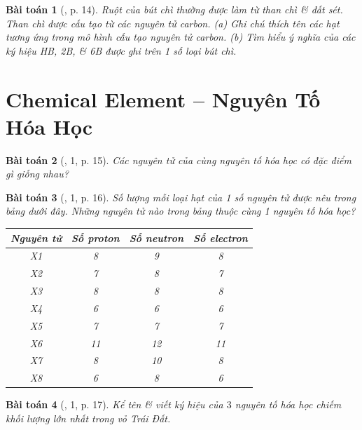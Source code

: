 \documentclass{article}
\newtheorem{baitoan}{Bài toán}
\begin{document}
\begin{baitoan}[\cite{SGK_KHTN_7_Canh_Dieu}, p. 14]
	Ruột của bút chì thường được làm từ than chì \& đất sét. Than chì được cấu tạo từ các nguyên tử carbon. (a) Ghi chú thích tên các hạt tương ứng trong mô hình cấu tạo nguyên tử carbon. (b) Tìm hiểu ý nghĩa của các ký hiệu HB, 2B, \& 6B được ghi trên 1 số loại bút chì.
\end{baitoan}


\section{Chemical Element -- Nguyên Tố Hóa Học}

\begin{baitoan}[\cite{SGK_KHTN_7_Canh_Dieu}, 1, p. 15]
	Các nguyên tử của cùng nguyên tố hóa học có đặc điểm gì giống nhau?
\end{baitoan}

\begin{baitoan}[\cite{SGK_KHTN_7_Canh_Dieu}, 1, p. 16]
	Số lượng mỗi loại hạt của 1 số nguyên tử được nêu trong bảng dưới đây. Những nguyên tử nào trong bảng thuộc cùng 1 nguyên tố hóa học?
	\begin{table}[H]
		\centering
		\begin{tabular}{|c|c|c|c|}
			\hline
			Nguyên tử & Số proton & Số neutron & Số electron \\
			\hline
			X1 & 8 & 9 & 8 \\
			\hline
			X2 & 7 & 8 & 7 \\
			\hline
			X3 & 8 & 8 & 8 \\
			\hline
			X4 & 6 & 6 & 6 \\
			\hline
			X5 & 7 & 7 & 7 \\
			\hline
			X6 & 11 & 12 & 11 \\
			\hline
			X7 & 8 & 10 & 8 \\
			\hline
			X8 & 6 & 8 & 6 \\
			\hline
		\end{tabular}
	\end{table}
\end{baitoan}

\begin{baitoan}[\cite{SGK_KHTN_7_Canh_Dieu}, 1, p. 17]
	Kể tên \& viết ký hiệu của $3$ nguyên tố hóa học chiếm khối lượng lớn nhất trong vỏ Trái Đất.
\end{baitoan}
\end{document}
